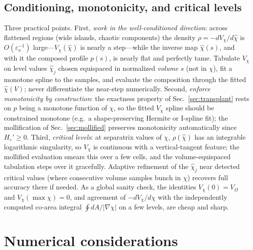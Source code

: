 \documentclass[english]{article}
\begin{document}
\subsection{Conditioning, monotonicity, and critical levels}
\label{sec:Vchi_conditioning}

Three practical points. First, \emph{work in the well-conditioned direction}: across flattened
regions (wide islands, chaotic components) the density $\rho=-dV_\chi/d\hat\chi$ is
$O(\varepsilon_\kappa^{-1})$ large---$V_\chi(\hat\chi)$ is nearly a step---while the inverse map
$\hat\chi(s)$, and with it the composed profile $p(s)$, is nearly flat and perfectly tame.
Tabulate $V_\chi$ on level values $\hat\chi_j$ chosen equispaced in normalized
\emph{volume} $s$ (not in $\chi$),
fit a monotone spline to the samples, and evaluate the composition through the fitted
$\hat\chi(V)$; never differentiate the near-step numerically. Second, \emph{enforce monotonicity
by construction}: the exactness property of Sec.~\ref{sec:transplant} rests on $p$ being a
monotone function of $\chi$, so the fitted $V_\chi$ spline should be constrained monotone (e.g.\ a
shape-preserving Hermite or I-spline fit); the mollification of Sec.~\ref{sec:mollified} preserves
monotonicity automatically since $H_\varepsilon'\ge0$. Third, \emph{critical levels}: at separatrix
values of $\chi$, $\rho(\hat\chi)$ has an integrable logarithmic singularity, so $V_\chi$ is
continuous with a vertical-tangent feature; the mollified evaluation smears this over a few cells,
and the volume-equispaced tabulation steps over it gracefully. Adaptive refinement of the
$\hat\chi_j$ near detected critical values (where consecutive volume samples bunch in $\chi$)
recovers full accuracy there if needed. As a global sanity check, the identities
$V_\chi(0)=V_\Omega$ and $V_\chi(\max\chi)=0$, and agreement of $-dV_\chi/d\hat\chi$ with the
independently computed co-area integral $\oint dA/|\nabla\chi|$ on a few levels, are cheap and
sharp.

\section{Numerical considerations}
\label{sec:numerics}
\end{document}
